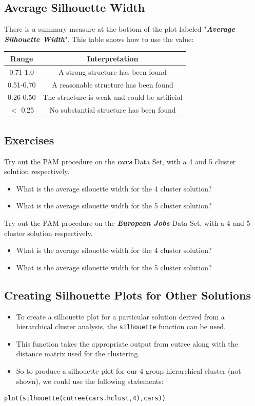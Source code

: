 \documentclass[12pt]{article}
\begin{document}
\subsection*{Average Silhouette Width}
There is a summary measure at the bottom of the plot labeled "\textbf{\textit{Average Silhouette Width}}". This table shows how to use the value:
\bigskip

\begin{tabular}{|c|c|}
\hline
Range 	& Interpretation \\ \hline \hline
0.71-1.0 &	A strong structure has been found \\ \hline
0.51-0.70&  	A reasonable structure has been found \\ \hline
0.26-0.50&	The structure is weak and could be artificial \\ \hline
$<$ 0.25&	No substantial structure has been found \\ \hline
\end{tabular} 
\subsection*{Exercises}
Try out the PAM procedure on the \textbf{\textit{cars}} Data Set, with a 4 and 5 cluster solution respectively.
\begin{itemize}
\item What is the average silouette width for the 4 cluster solution?
\item What is the average silouette width for the 5 cluster solution?
\end{itemize}
Try out the PAM procedure on the \textbf{\textit{European Jobs}} Data Set, with a 4 and 5 cluster solution respectively.
\begin{itemize}
\item What is the average silouette width for the 4 cluster solution?
\item What is the average silouette width for the 5 cluster solution?
\end{itemize}
\newpage
\subsection*{Creating Silhouette Plots for Other Solutions}
\begin{itemize}
\item To create a silhouette plot for a particular solution derived from a hierarchical cluster analysis, the \texttt{silhouette} function can be used. 
\item This function takes the appropriate output from cutree along with the distance matrix used for the clustering. 
\item So to produce a silhouette plot for our 4 group hierarchical cluster (not shown), we could use the following statements:
\end{itemize}
\begin{framed}
\begin{verbatim}
plot(silhouette(cutree(cars.hclust,4),cars))
\end{verbatim}
\end{framed}
\end{document}
